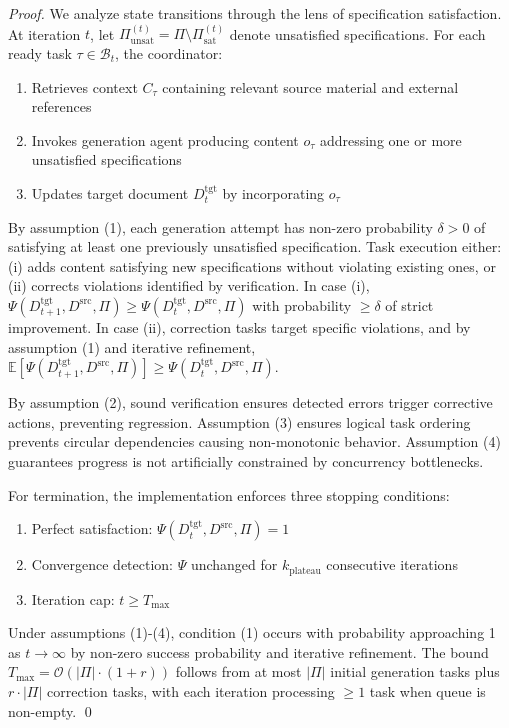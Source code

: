 \documentclass{ieeeaccess}
\begin{document}
\begin{proof}
We analyze state transitions through the lens of specification satisfaction. At iteration \(t\), let \(\Pi_{\text{unsat}}^{(t)} = \Pi \setminus \Pi_{\text{sat}}^{(t)}\) denote unsatisfied specifications. For each ready task \(\tau \in \mathcal{B}_t\), the coordinator:

\begin{enumerate}
\item Retrieves context \(C_\tau\) containing relevant source material and external references
\item Invokes generation agent producing content \(o_\tau\) addressing one or more unsatisfied specifications
\item Updates target document \(D^{\text{tgt}}_t\) by incorporating \(o_\tau\)
\end{enumerate}

By assumption (1), each generation attempt has non-zero probability \(\delta > 0\) of satisfying at least one previously unsatisfied specification. Task execution either: (i) adds content satisfying new specifications without violating existing ones, or (ii) corrects violations identified by verification. In case (i), \(\Psi(D^{\text{tgt}}_{t+1}, D^{\text{src}}, \Pi) \geq \Psi(D^{\text{tgt}}_t, D^{\text{src}}, \Pi)\) with probability \(\geq \delta\) of strict improvement. In case (ii), correction tasks target specific violations, and by assumption (1) and iterative refinement, \(\mathbb{E}[\Psi(D^{\text{tgt}}_{t+1}, D^{\text{src}}, \Pi)] \geq \Psi(D^{\text{tgt}}_t, D^{\text{src}}, \Pi)\).

By assumption (2), sound verification ensures detected errors trigger corrective actions, preventing regression. Assumption (3) ensures logical task ordering prevents circular dependencies causing non-monotonic behavior. Assumption (4) guarantees progress is not artificially constrained by concurrency bottlenecks.

For termination, the implementation enforces three stopping conditions:
\begin{enumerate}
\item Perfect satisfaction: \(\Psi(D^{\text{tgt}}_t, D^{\text{src}}, \Pi) = 1\)
\item Convergence detection: \(\Psi\) unchanged for \(k_{\text{plateau}}\) consecutive iterations
\item Iteration cap: \(t \geq T_{\max}\)
\end{enumerate}

Under assumptions (1)-(4), condition (1) occurs with probability approaching 1 as \(t \to \infty\) by non-zero success probability and iterative refinement. The bound \(T_{\max} = \mathcal{O}(|\Pi| \cdot (1 + r))\) follows from at most \(|\Pi|\) initial generation tasks plus \(r \cdot |\Pi|\) correction tasks, with each iteration processing \(\geq 1\) task when queue is non-empty. \qed
\end{proof}
\end{document}
